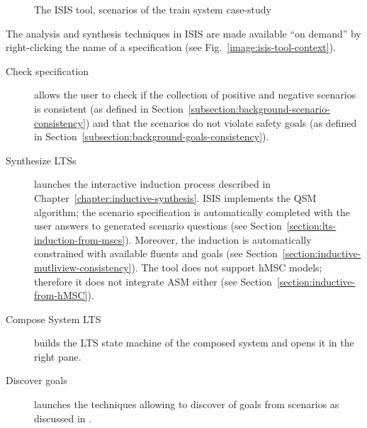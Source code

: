 \begin{figure}
\centering{}
  \caption{The ISIS tool, scenarios of the train system case-study\label{image:isis-tool}}
\end{figure}

The analysis and synthesis techniques in ISIS are made available ``on demand'' by right-clicking the name of a specification (see Fig.~\ref{image:isis-tool-context}).
\begin{description}
\item[Check specification] allows the user to check if the collection of positive and negative scenarios is consistent (as defined in Section~\ref{subsection:background-scenario-consistency}) and that the scenarios do not violate safety goals (as defined in Section~\ref{subsection:background-goals-consistency}).
\item[Synthesize LTSs] launches the interactive induction process described in Chapter~\ref{chapter:inductive-synthesis}. ISIS implements the QSM algorithm; the scenario specification is automatically completed with the user answers to generated scenario questions (see Section~\ref{section:lts-induction-from-mscs}). Moreover, the induction is automatically constrained with available fluents and goals (see Section~\ref{section:inductive-mutliview-consistency}). The tool does not support hMSC models; therefore it does not integrate ASM either (see Section~\ref{section:inductive-from-hMSC}).
\item[Compose System LTS] builds the LTS state machine of the composed system and opens it in the right pane.
\item[Discover goals] launches the techniques allowing to discover of goals from scenarios as discussed in \cite{Damas:2006, Damas:2011}.
\end{description}

